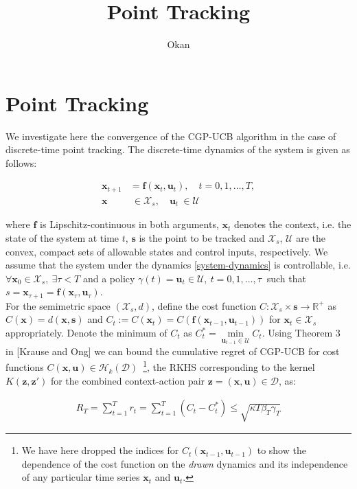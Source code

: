 \documentclass[10pt,a4paper]{article}
\author{Okan}
\title{Point Tracking}
\newcommand{\state}{\mathbf{x}} %
\newcommand{\traj}{\mathbf{s}} %
\newcommand{\sysInput}{\mathbf{u}} %
\begin{document}
\section{Point Tracking}

We investigate here the convergence of the CGP-UCB algorithm in the case of discrete-time point tracking. The discrete-time dynamics of the system is given as follows:

\begin{align}
\state_{t+1} &= \mathbf{f}(\state_t,\sysInput_t), \quad  t = 0,1,\ldots,T, \label{system-dynamics}\\
\state & \ \in \mathcal{X}_s, \quad \sysInput_t \ \in \mathcal{U}
\end{align}

where $\mathbf	{f}$ is Lipschitz-continuous in both arguments, $\state_t$ denotes the context, i.e. the state of the system at time $t$, $\traj$ is the point to be tracked and $\mathcal{X}_s$, $\mathcal{U}$ are the convex, compact sets of allowable states and control inputs, respectively. We assume that the system under the dynamics \eqref{system-dynamics} is controllable, i.e. $\forall \state_0 \in \mathcal{X}_s, \ \exists \tau < T$ and a policy $\gamma(t) = \sysInput_t \in \mathcal{U}, \ t = 0,1,\ldots,\tau \ $ such that $s = \state_{\tau+1} = \mathbf{f}(\state_{\tau},\sysInput_{\tau})$. \\


For the semimetric space $(\mathcal{X}_s, d)$, define the cost function $C : \mathcal{X}_s \times \traj \to \mathbb{R}^{+}$ as $C(\state) = d(\state, \traj)$ and $C_t:=C(\state_t)=C(\mathbf{f}(\state_{t-1}, \sysInput_{t-1}))$ for $\state_t \in \mathcal{X}_s$ appropriately. 
Denote the minimum of $C_t$ as $C_t^{*} = \min\limits_{\sysInput_{t-1} \in \mathcal{U}} C_{t}$. Using Theorem 3 in [Krause and Ong] we can bound the cumulative regret of CGP-UCB for cost functions $C(\state, \sysInput) \in \mathcal{H}_k(\mathcal{D})$~\footnote{We have here dropped the indices for $C_t(\state_{t-1}, \sysInput_{t-1})$ to show the dependence of the cost function on the \emph{drawn} dynamics and its independence of any particular time series $\state_t$ and $\sysInput_t$.}, the RKHS corresponding to the kernel $K(\mathbf{z},\mathbf{z}')$ for the combined context-action pair $\mathbf{z} = (\state, \sysInput) \in \mathcal{D}$, as:

\begin{align}
R_T = \sum_{t=1}^{T}r_t = \sum_{t = 1}^{T} (C_{t} - C_{t}^{*}) \leq \sqrt{\kappa T \beta_{T} \gamma_{T}} \label{cum-regret}
\end{align}
\end{document}
